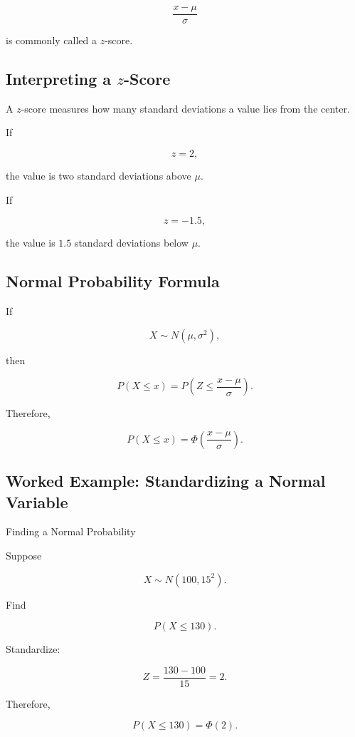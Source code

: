 \[
\frac{x-\mu}{\sigma}
\]

is commonly called a \(z\)-score.

\subsection{Interpreting a \(z\)-Score}
\label{subsec:z-score-interpretation}

A \(z\)-score measures how many standard deviations a value lies from
the center.

If

\[
z=2,
\]

the value is two standard deviations above \(\mu\).

If

\[
z=-1.5,
\]

the value is \(1.5\) standard deviations below \(\mu\).

\subsection{Normal Probability Formula}
\label{subsec:normal-probability-formula}

If

\[
X\sim N(\mu,\sigma^2),
\]

then

\[
P(X\leq x)
=
P
\left(
Z\leq
\frac{x-\mu}{\sigma}
\right).
\]

Therefore,

\[
\boxed{
P(X\leq x)
=
\Phi
\left(
\frac{x-\mu}{\sigma}
\right).
}
\]

\subsection{Worked Example: Standardizing a Normal Variable}
\label{subsec:worked-normal-standardization}

\begin{workedexamplebox}{Finding a Normal Probability}

Suppose

\[
X\sim N(100,15^2).
\]

Find

\[
P(X\leq130).
\]

Standardize:

\[
Z
=
\frac{130-100}{15}
=
2.
\]

Therefore,

\begin{answerbox}
\[
\boxed{
P(X\leq130)
=
\Phi(2).
}
\]
\end{answerbox}

\end{workedexamplebox}

